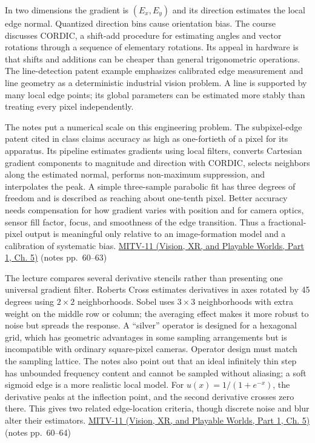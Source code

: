 In two dimensions the gradient is \((E_x,E_y)\) and its direction estimates the local edge normal. Quantized direction bins cause orientation bias. The course discusses CORDIC, a shift-add procedure for estimating angles and vector rotations through a sequence of elementary rotations. Its appeal in hardware is that shifts and additions can be cheaper than general trigonometric operations. The line-detection patent example emphasizes calibrated edge measurement and line geometry as a deterministic industrial vision problem. A line is supported by many local edge points; its global parameters can be estimated more stably than treating every pixel independently.

The notes put a numerical scale on this engineering problem. The subpixel-edge patent cited in class claims accuracy as high as one-fortieth of a pixel for its apparatus. Its pipeline estimates gradients using local filters, converts Cartesian gradient components to magnitude and direction with CORDIC, selects neighbors along the estimated normal, performs non-maximum suppression, and interpolates the peak. A simple three-sample parabolic fit has three degrees of freedom and is described as reaching about one-tenth pixel. Better accuracy needs compensation for how gradient varies with position and for camera optics, sensor fill factor, focus, and smoothness of the edge transition. Thus a fractional-pixel output is meaningful only relative to an image-formation model and a calibration of systematic bias. \href{../07-Vision-XR-and-Playable-Worlds-P01/main.pdf\#nameddest=04-visual-computing-ii-ch036-mitv-11---edge-detection-subpixel-position-cordic-line-detection-us-6408109}{MITV-11 (Vision, XR, and Playable Worlds, Part 1, Ch. 5)} (notes pp.~60--63)

The lecture compares several derivative stencils rather than presenting one universal gradient filter. Roberts Cross estimates derivatives in axes rotated by 45 degrees using \(2\times2\) neighborhoods. Sobel uses \(3\times3\) neighborhoods with extra weight on the middle row or column; the averaging effect makes it more robust to noise but spreads the response. A ``silver'' operator is designed for a hexagonal grid, which has geometric advantages in some sampling arrangements but is incompatible with ordinary square-pixel cameras. Operator design must match the sampling lattice. The notes also point out that an ideal infinitely thin step has unbounded frequency content and cannot be sampled without aliasing; a soft sigmoid edge is a more realistic local model. For \(u(x)=1/(1+e^{-x})\), the derivative peaks at the inflection point, and the second derivative crosses zero there. This gives two related edge-location criteria, though discrete noise and blur alter their estimators. \href{../07-Vision-XR-and-Playable-Worlds-P01/main.pdf\#nameddest=04-visual-computing-ii-ch036-mitv-11---edge-detection-subpixel-position-cordic-line-detection-us-6408109}{MITV-11 (Vision, XR, and Playable Worlds, Part 1, Ch. 5)} (notes pp.~60--64)

